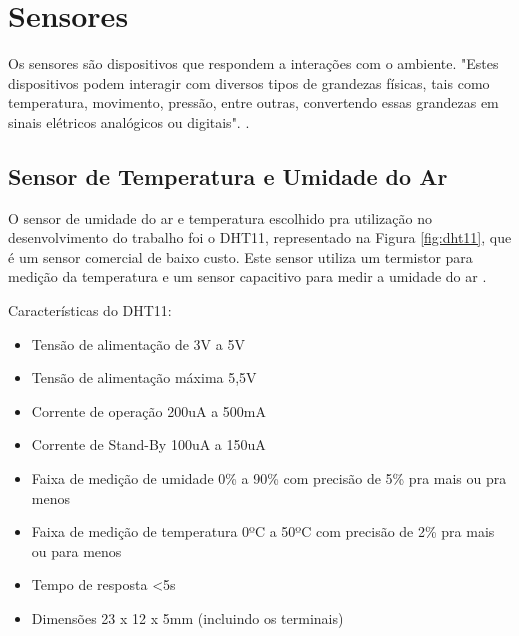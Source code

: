 
\section{Sensores}

Os sensores são dispositivos que respondem a interações com o ambiente. "Estes dispositivos podem interagir com diversos tipos de grandezas físicas, tais como temperatura, movimento, pressão, entre outras, convertendo essas grandezas em sinais elétricos analógicos ou digitais". \cite{marchesan2012sensores}.

\subsection{Sensor de Temperatura e Umidade do Ar}

O sensor de umidade do ar e temperatura escolhido pra utilização no desenvolvimento do trabalho foi o DHT11, representado na Figura \ref{fig:dht11}, que é um sensor comercial de baixo custo. Este sensor utiliza um termistor para medição da temperatura e um sensor capacitivo para medir a umidade do ar \cite{gay2014dht11}.

Características do DHT11:
\begin{itemize}
\item Tensão de alimentação de 3V a 5V
\item Tensão de alimentação máxima 5,5V
\item Corrente de operação 200uA a 500mA
\item Corrente de Stand-By 100uA a 150uA
\item Faixa de medição de umidade 0\% a 90\% com precisão de 5\%
 pra mais ou pra menos
\item Faixa de medição de temperatura 0ºC a 50ºC com precisão de 2\% pra mais ou para menos
\item Tempo de resposta <5s
\item Dimensões 23 x 12 x 5mm (incluindo os terminais)
\end{itemize}

